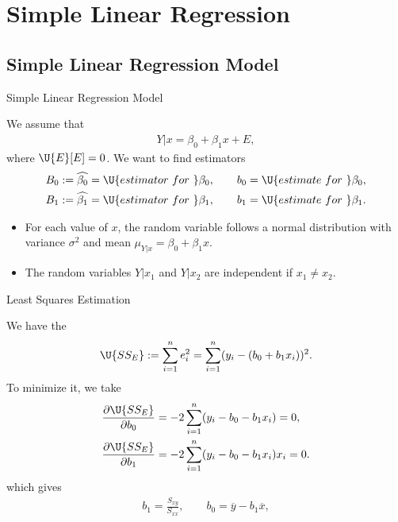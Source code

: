 \section{Simple Linear Regression}

\subsection{Simple Linear Regression Model}

\begin{frame}{Simple Linear Regression Model}

\justifying
{} We assume that
\begin{align*}
Y|x = \beta_0 + \beta_1 x + E,
\end{align*}
where $\U{E}[E] = 0$. We want to find estimators
\begin{align*}
B_0 & := \widehat{\beta_0} = \U{estimator\ for\ } \beta_0, \qquad b_0 = \U{estimate\ for\ } \beta_0, \\
B_1 & := \widehat{\beta_1} = \U{estimator\ for\ } \beta_1, \qquad b_1 = \U{estimate\ for\ } \beta_1.
\end{align*}
\begin{itemize}
	\justifying
	\item For each value of $x$, the random variable follows a normal distribution with variance $\sigma^2$ and mean $\mu_{Y|x} = \beta_0 + \beta_1 x$.
	\item The random variables $Y|x_1$ and $Y|x_2$ are independent if $x_1\neq x_2$.
\end{itemize}

\end{frame}


\begin{frame}{Least Squares Estimation}

\justifying
{} We have the 
\begin{align*}
\U{SS_E} := \sum_{i=1}^n e_i^2 = \sum_{i=1}^n (y_i-(b_0+b_1x_i))^2.
\end{align*}
To minimize it, we take
\begin{align*}
\frac{\partial \U{SS_E}}{\partial b_0} & = -2\sum_{i=1}^n (y_i-b_0-b_1x_i) = 0, \\
\frac{\partial \U{SS_E}}{\partial b_1} & = -2\sum_{i=1}^n (y_i-b_0-b_1x_i)x_i = 0.
\end{align*}
which gives
\begin{align*}
b_1 = \frac{S_{xy}}{S_{xx}}, \qquad b_0 = \overline{y} - b_1\overline{x},
\end{align*}

\end{frame}


